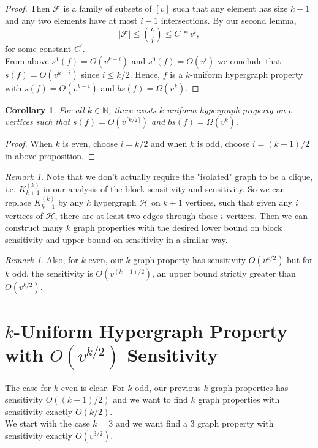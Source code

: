 \documentclass[psamsfonts]{amsart}
\newtheorem{cor}[theorem]{Corollary}
\theoremstyle{definition}
\theoremstyle{remark}
\newtheorem{rem}[theorem]{Remark}
\numberwithin{equation}{section}
\begin{document}
\begin{proof}
		\indent Then $\mathcal{F}$ is a family of subsets of $[v]$ such that any element has size $k+1$ and any two elements have at most $i-1$ intersections. By our second lemma,
		\begin{equation}
			|\mathcal{F}| \leq {v \choose{i}} \leq C^{\prime} * v^i,
		\end{equation}
		for some constant $C^\prime$.\\
		\indent From above $s^1(f) = O(v^{k-i})$ and $s^0(f) = O(v^{i})$ we conclude that $s(f) = O(v^{k-i})$ since $i \leq k/2$. Hence, $f$ is a $k$-uniform hypergraph property with $s(f)=O(v^{k-i})$ and $bs(f) = \Omega(v^{k})$.
	\end{proof}
	
	\begin{cor}
		For all $k \in \mathbb{N}$, there exists $k$-uniform hypergraph property on $v$ vertices such that $s(f) = O(v^{\lceil k/2 \rceil})$ and $bs(f)= \Omega (v^k)$.
	\end{cor}
	\begin{proof}
		When $k$ is even, choose $i=k/2$ and when $k$ is odd, choose $i=(k-1)/2$ in above proposition.
	\end{proof}
	
	\begin{rem}
		Note that we don't actually require the "isolated" graph to be a clique, i.e. $K_{k+1}^{(k)}$ in our analysis of the block sensitivity and sensitivity. So we can replace $K_{k+1}^{(k)}$ by any $k$ hypergraph $\mathcal{H}$ on $k+1$ vertices, such that given any $i$ vertices of $\mathcal{H}$, there are at least two edges through these $i$ vertices. Then we can construct many $k$ graph properties with the desired lower bound on block sensitivity and upper bound on sensitivity in a similar way.
	\end{rem}
	
	\begin{rem}
		Also, for $k$ even, our $k$ graph property has sensitivity $O(v^{k/2})$ but for $k$ odd, the sensitivity is $O(v^{(k+1)/2})$, an upper bound strictly greater than $O(v^{k/2})$.
	\end{rem}
	
	\section{$k$-Uniform  Hypergraph Property with $O(v^{k/2})$ Sensitivity}
	The case for $k$ even is clear. For $k$ odd, our previous $k$ graph properties has sensitivity  $O((k+1)/2)$ and we want to find $k$ graph properties with sensitivity exactly $O(k/2)$.\\
	\indent We start with the case $k=3$ and we want find a $3$ graph property with sensitivity exactly $O(v^{3/2})$.
	
\end{document}
